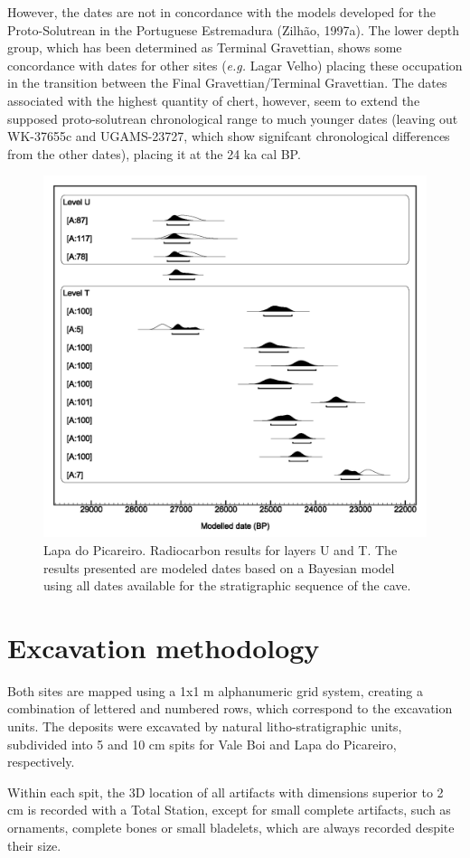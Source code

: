 \documentclass[12pt,twoside]{reedthesis}
\begin{document}
However, the dates are not in concordance with the models developed for the Proto-Solutrean in the Portuguese Estremadura (Zilhão, 1997a). The lower depth group, which has been determined as Terminal Gravettian, shows some concordance with dates for other sites (\emph{e.g.} Lagar Velho) placing these occupation in the transition between the Final Gravettian/Terminal Gravettian. The dates associated with the highest quantity of chert, however, seem to extend the supposed proto-solutrean chronological range to much younger dates (leaving out WK-37655c and UGAMS-23727, which show signifcant chronological differences from the other dates), placing it at the 24 ka cal BP.
\begin{figure}

{\centering \includegraphics[width=0.6\linewidth]{figure/c14_LP} 

}

\caption{Lapa do Picareiro. Radiocarbon results for layers U and T. The results presented are modeled dates based on a Bayesian model using all dates available for the stratigraphic sequence of the cave.}\label{fig:c14LP}
\end{figure}
\hypertarget{excavation-methodology}{%
\section{Excavation methodology}\label{excavation-methodology}}

Both sites are mapped using a 1x1 m alphanumeric grid system, creating a combination of lettered and numbered rows, which correspond to the excavation units. The deposits were excavated by natural litho-stratigraphic units, subdivided into 5 and 10 cm spits for Vale Boi and Lapa do Picareiro, respectively.

Within each spit, the 3D location of all artifacts with dimensions superior to 2 cm is recorded with a Total Station, except for small complete artifacts, such as ornaments, complete bones or small bladelets, which are always recorded despite their size.
\end{document}

